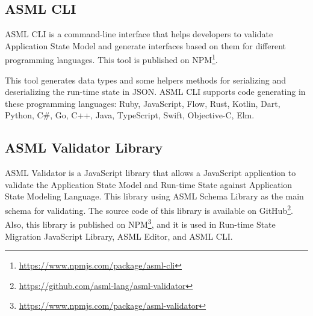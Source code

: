 \subsection{ASML CLI}
ASML CLI is a command-line interface that helps developers to validate Application State Model and generate interfaces based on them for different programming languages. This tool is published on NPM\footnote{\url{https://www.npmjs.com/package/asml-cli}}.

This tool generates data types and some helpers methods for serializing and deserializing the run-time state in JSON. ASML CLI supports code generating in these programming languages:
Ruby, JavaScript, Flow, Rust, Kotlin, Dart, Python, C\#, Go, C++, Java, TypeScript, Swift, Objective-C, Elm.

\subsection{ASML Validator Library}
ASML Validator is a JavaScript library that allows a JavaScript application to validate the Application State Model and Run-time State against Application State Modeling Language. This library using ASML Schema Library as the main schema for validating. The source code of this library is available on GitHub\footnote{\url{https://github.com/asml-lang/asml-validator}}. Also, this library is published on NPM\footnote{\url{https://www.npmjs.com/package/asml-validator}}, and it is used in Run-time State Migration JavaScript Library, ASML Editor, and ASML CLI.

